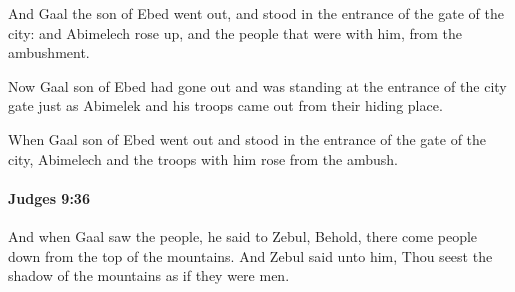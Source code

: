 			\begin{versebox}
					\item[BHS] 
					\item[ASV] And Gaal the son of Ebed went out, and stood in the entrance of the gate of the city: and Abimelech rose up, and the people that were with him, from the ambushment.
					\item[NIV] Now Gaal son of Ebed had gone out and was standing at the entrance of the city gate just as Abimelek and his troops came out from their hiding place.
					\item[NRSV] When Gaal son of Ebed went out and stood in the entrance of the gate of the city, Abimelech and the troops with him rose from the ambush.
			\end{versebox}

		\paragraph{Judges 9:36} %
			\label{JUDGES-9-36}

			And when Gaal saw the people, he said to Zebul, Behold, there come people down from the top of the mountains. And Zebul said unto him, Thou seest the shadow of the mountains as if they were men.

